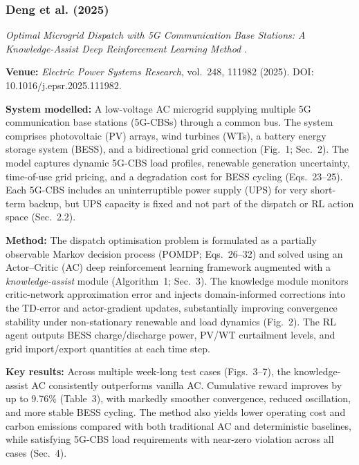 \subsubsection{Deng et al. (2025)}
\label{sec:deng-et-al}
\textit{Optimal Microgrid Dispatch with 5G Communication Base Stations: A Knowledge-Assist Deep Reinforcement Learning Method} \cite{deng_2025_5g_microgrid_ka}.

\textbf{Venue:} \textit{Electric Power Systems Research}, vol.~248, 111982 (2025). DOI: 10.1016/j.epsr.2025.111982.

\textbf{System modelled:} A low-voltage AC microgrid supplying multiple 5G communication base stations (5G-CBSs) through a common bus. The system comprises photovoltaic (PV) arrays, wind turbines (WTs), a battery energy storage system (BESS), and a bidirectional grid connection (Fig.~1; Sec.~2). The model captures dynamic 5G-CBS load profiles, renewable generation uncertainty, time-of-use grid pricing, and a degradation cost for BESS cycling (Eqs.~23--25). Each 5G-CBS includes an uninterruptible power supply (UPS) for very short-term backup, but UPS capacity is fixed and not part of the dispatch or RL action space (Sec.~2.2).

\textbf{Method:} The dispatch optimisation problem is formulated as a partially observable Markov decision process (POMDP; Eqs.~26--32) and solved using an Actor--Critic (AC) deep reinforcement learning framework augmented with a \emph{knowledge-assist} module (Algorithm~1; Sec.~3). The knowledge module monitors critic-network approximation error and injects domain-informed corrections into the TD-error and actor-gradient updates, substantially improving convergence stability under non-stationary renewable and load dynamics (Fig.~2). The RL agent outputs BESS charge/discharge power, PV/WT curtailment levels, and grid import/export quantities at each time step.

\textbf{Key results:} Across multiple week-long test cases (Figs.~3--7), the knowledge-assist AC consistently outperforms vanilla AC. Cumulative reward improves by up to 9.76\% (Table~3), with markedly smoother convergence, reduced oscillation, and more stable BESS cycling. The method also yields lower operating cost and carbon emissions compared with both traditional AC and deterministic baselines, while satisfying 5G-CBS load requirements with near-zero violation across all cases (Sec.~4).

